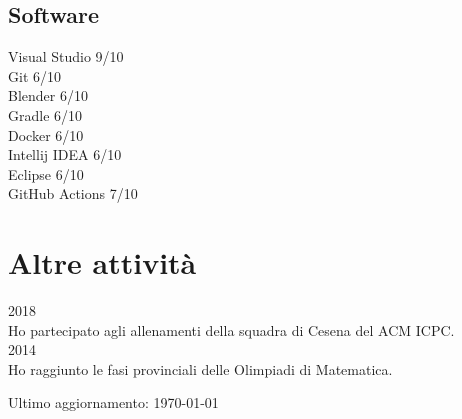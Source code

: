 \documentclass{article}
\newcommand{\years}[1]{{\large #1}\\}
\newcommand{\skill}[2]{#1 #2/10}
\begin{document}
	\subsection*{Software}
	\skill{Visual Studio}{9}\\
	\skill{Git}{6}\\
	\skill{Blender}{6}\\
	\skill{Gradle}{6}\\
	\skill{Docker}{6}\\
	\skill{Intellij IDEA}{6}\\
	\skill{Eclipse}{6}\\
	\skill{GitHub Actions}{7}
	
	\section*{Altre attività}
	\years{2018} Ho partecipato agli allenamenti della squadra di Cesena del ACM ICPC.\\
	
	\years{2014} Ho raggiunto le fasi provinciali delle Olimpiadi di Matematica.
	
	\vfill
	\begin{center}
		\scriptsize
		Ultimo aggiornamento: \today
	\end{center}
	
\end{document}
